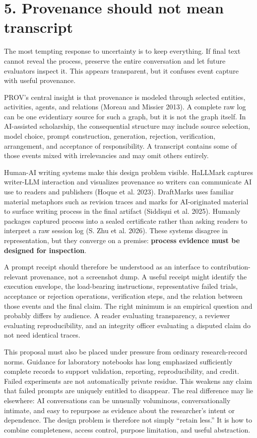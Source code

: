 \documentclass[
]{article}
\begin{document}
\section{5. Provenance should not mean
transcript}\label{provenance-should-not-mean-transcript}

The most tempting response to uncertainty is to keep everything. If
final text cannot reveal the process, preserve the entire conversation
and let future evaluators inspect it. This appears transparent, but it
confuses event capture with useful provenance.

PROV's central insight is that provenance is modeled through selected
entities, activities, agents, and relations (Moreau and Missier 2013). A
complete raw log can be one evidentiary source for such a graph, but it
is not the graph itself. In AI-assisted scholarship, the consequential
structure may include source selection, model choice, prompt
construction, generation, rejection, verification, arrangement, and
acceptance of responsibility. A transcript contains some of those events
mixed with irrelevancies and may omit others entirely.

Human-AI writing systems make this design problem visible. HaLLMark
captures writer-LLM interaction and visualizes provenance so writers can
communicate AI use to readers and publishers (Hoque et al. 2023).
DraftMarks uses familiar material metaphors such as revision traces and
marks for AI-originated material to surface writing process in the final
artifact (Siddiqui et al. 2025). Humanly packages captured process into
a sealed certificate rather than asking readers to interpret a raw
session log (S. Zhu et al. 2026). These systems disagree in
representation, but they converge on a premise: \textbf{process evidence
must be designed for inspection}.

A prompt receipt should therefore be understood as an interface to
contribution-relevant provenance, not a screenshot dump. A useful
receipt might identify the execution envelope, the load-bearing
instructions, representative failed trials, acceptance or rejection
operations, verification steps, and the relation between those events
and the final claim. The right minimum is an empirical question and
probably differs by audience. A reader evaluating transparency, a
reviewer evaluating reproducibility, and an integrity officer evaluating
a disputed claim do not need identical traces.

This proposal must also be placed under pressure from ordinary
research-record norms. Guidance for laboratory notebooks has long
emphasized sufficiently complete records to support validation,
reporting, reproducibility, and credit. Failed experiments are not
automatically private residue. This weakens any claim that failed
prompts are uniquely entitled to disappear. The real difference may lie
elsewhere: AI conversations can be unusually voluminous,
conversationally intimate, and easy to repurpose as evidence about the
researcher's intent or dependence. The design problem is therefore not
simply ``retain less.'' It is how to combine completeness, access
control, purpose limitation, and useful abstraction.
\end{document}

